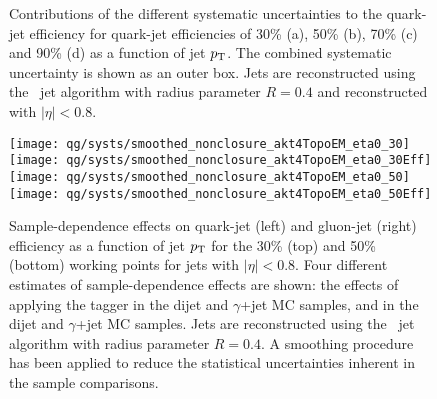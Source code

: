 \begin{figure}[htbp]
\begin{center}
\caption{
Contributions of the different systematic uncertainties to the quark-jet efficiency 
for quark-jet efficiencies of 30\% (a), 50\% (b), 70\% (c) and 90\% (d) 
as a function of jet $p_{\text{T}}$. The combined systematic uncertainty is 
shown as an outer box.  
Jets are reconstructed using the \AKT\ jet algorithm with radius parameter 
$R=0.4$ and reconstructed with $|\eta|<0.8$. }
\label{fig:jet-reconstruction:qg:systSplitQ}
\end{center}
\end{figure}

\begin{figure*}[htbp]
\begin{center}
\texttt{[image: qg/systs/smoothed\_nonclosure\_akt4TopoEM\_eta0\_30]}
\texttt{[image: qg/systs/smoothed\_nonclosure\_akt4TopoEM\_eta0\_30Eff]} \\
\texttt{[image: qg/systs/smoothed\_nonclosure\_akt4TopoEM\_eta0\_50]}
\texttt{[image: qg/systs/smoothed\_nonclosure\_akt4TopoEM\_eta0\_50Eff]} \\
\caption{ Sample-dependence effects on quark-jet (left) and gluon-jet (right) efficiency as a function
of jet $p_{\text{T}}$ for the 30\% (top) and 50\% (bottom) working points for jets with $|\eta|<0.8$.  Four different estimates
of sample-dependence effects are shown: the effects of applying the tagger in the
dijet and $\gamma$+jet  MC samples, and in the dijet and $\gamma$+jet \Herwigpp MC samples.
Jets are reconstructed using the \AKT\ jet algorithm with radius parameter $R=0.4$.
A smoothing procedure has been applied to reduce the statistical uncertainties inherent in the
sample comparisons.
}
\label{fig:jet-reconstruction:qg:extractSyst}
\end{center}
\end{figure*}


